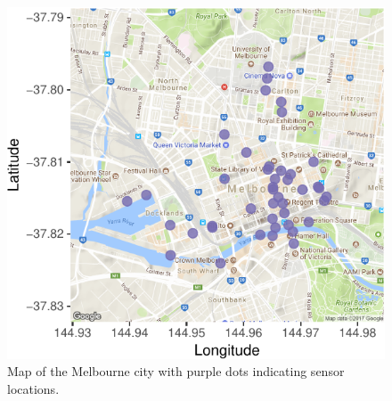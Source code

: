 \documentclass[article]{jss}
\theoremstyle{definition}
\theoremstyle{definition}
\theoremstyle{remark}
\begin{document}
\begin{CodeChunk}
\begin{figure}

{\centering \includegraphics[width=0.55\linewidth]{figure/ped-map-1} 

}

\caption[Map of the Melbourne city with purple dots indicating
sensor locations.]{Map of the Melbourne city with purple dots indicating
sensor locations.}\label{fig:ped-map}
\end{figure}
\end{CodeChunk}
\end{document}
